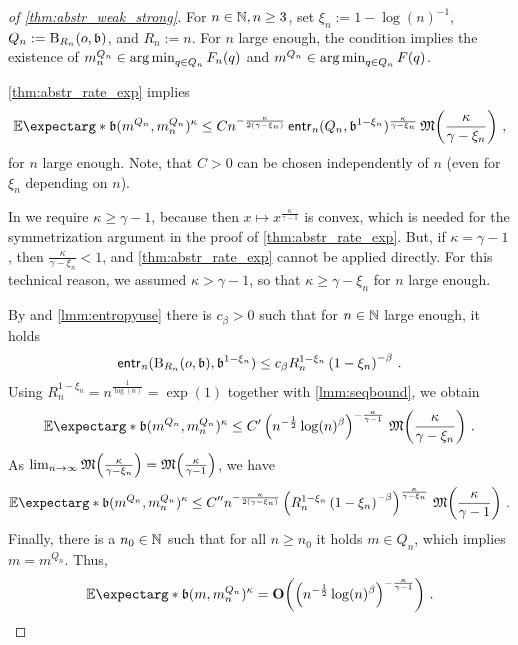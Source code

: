 \begin{proof}[of \autoref{thm:abstr_weak_strong}]
	For $n\in\mathbb{N}, n\geq 3$, set $\xi_n := 1 - \log(n)^{-1}$, $Q_n := \operatorname{\mathrm{B}}_{R_n}(o, \mathfrak{b})$, and $R_n := n$.
	For $n$ large enough, the  condition implies the existence of $m^{Q_n}_n \in \operatorname*{arg\,min}_{q\in Q_n} F_n(q)$ and $m^{Q_n}\in\operatorname*{arg\,min}_{q\in Q_n} F(q)$.
	
	\autoref{thm:abstr_rate_exp} implies
	\begin{equation*}
		\Ex*{\mf b(m^{Q_n}, m^{Q_n}_n)^{\kappa}} \leq C n^{-\frac{\kappa}{2(\gamma-\xi_n)}} \entrn(Q_n, \mf b^{1-\xi_n})^{\frac{\kappa}{\gamma-\xi_n}}\, \mf M\brOf{\frac{\kappa}{\gamma-\xi_n}}
		\eqcm
	\end{equation*}
	for $n$ large enough.
	Note, that $C>0$ can be chosen independently of $n$ (even for $\xi_n$ depending on $n$).
	
	In  we require $\kappa \geq \gamma-1$, because then $x\mapsto x^{\frac{\kappa}{\gamma-1}}$ is convex, which is needed for the symmetrization argument in the proof of \autoref{thm:abstr_rate_exp}. But, if $\kappa = \gamma-1$, then $\frac{\kappa}{\gamma-\xi_n} < 1$, and \autoref{thm:abstr_rate_exp} cannot be applied directly. For this technical reason, we assumed $\kappa > \gamma-1$, so that $\kappa \geq \gamma-\xi_n$ for $n$ large enough.	
	
	By  and \autoref{lmm:entropyuse} there is $c_\beta>0$ such that for $n\in\mathbb{N}$ large enough, it holds 
	\begin{equation*}
		\operatorname{\mathsf{entr}_\mathit{n}}(\operatorname{\mathrm{B}}_{R_n}(o,\mathfrak{b}), \mathfrak{b}^{1-\xi_n}) \leq c_\beta R_n^{1-\xi_n} \left( {1-\xi_n} \right)^{-\beta}
		\, .
	\end{equation*}
	Using $R_n^{1-\xi_n} = n^{\frac1{\log(n)}} = \exp(1)$ together with \autoref{lmm:seqbound}, we obtain
	\begin{equation*}
		\Ex*{\mf b(m^{Q_n}, m^{Q_n}_n)^\kappa} \leq C\pr \br{n^{-\frac12} \log(n)^\beta}^{-\frac{\kappa}{\gamma-1}} \, \mf M\brOf{\frac{\kappa}{\gamma-\xi_n}}
		\eqfs
	\end{equation*}
	As $\lim_{n\to\infty}\mathfrak{M}\!\left( \frac{\kappa}{\gamma-\xi_n} \right) = \mathfrak{M}\!\left( \frac{\kappa}{\gamma-1} \right)$, we have 
	\begin{equation*}
		\Ex*{\mf b(m^{Q_n}, m^{Q_n}_n)^{\kappa}} \leq C\prr n^{-\frac{\kappa}{2(\gamma-\xi_n)}} \br{R_n^{1-\xi_n} \br{{1-\xi_n}}^{-\beta}}^{\frac{\kappa}{\gamma-\xi_n}}\, \mf M\brOf{\frac{\kappa}{\gamma-1}}
		\eqfs
	\end{equation*}
	Finally, there is a $n_0\in\mathbb{N}$ such that for all $n\geq n_0$ it holds $m \in Q_n$, which implies $m = m^{Q_n}$. Thus,
	\begin{equation*}
		\Ex*{\mf b(m, m^{Q_n}_n)^\kappa} = \bigO\brOf{\br{n^{-\frac12} \log(n)^\beta}^{-\frac{\kappa}{\gamma-1}}}
		\eqfs
	\end{equation*}
\end{proof}
%
%
%
